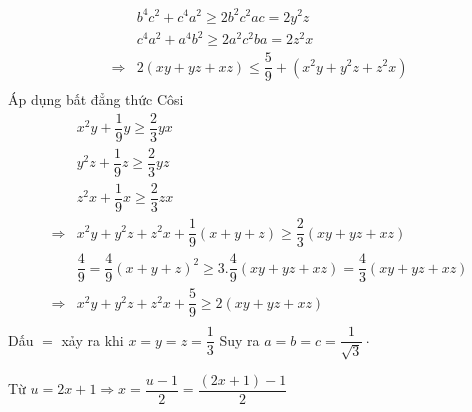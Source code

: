 \begin{ex}
{\begin{align*}
&b^4c^2+c^4a^2\geq 2b^2c^2ac=2y^2z\\&
c^4a^2+a^4b^2\geq 2a^2c^2ba=2z^2x\\
\Rightarrow & 2(xy+yz+xz)\leq \dfrac{5}{9}+(x^2y+y^2z+z^2x)\\&
\end{align*}
		Áp dụng bất đẳng thức Côsi
\begin{align*}
&x^2y+\dfrac{1}{9}y\geq \dfrac{2}{3}yx\\
&y^2z+\dfrac{1}{9}z\geq \dfrac{2}{3}yz\\
&z^2x+\dfrac{1}{9}x\geq \dfrac{2}{3}zx\\
\Rightarrow & x^2y+y^2z+z^2x+\dfrac{1}{9}(x+y+z)\geq \dfrac{2}{3}(xy+yz+xz)\\
&\dfrac{4}{9}=\dfrac{4}{9}(x+y+z)^2\geq 3.\dfrac{4}{9}(xy+yz+xz)=\dfrac{4}{3}(xy+yz+xz)\\
\Rightarrow & x^2y+y^2z+z^2x+\dfrac{5}{9}\geq 2(xy+yz+xz)\\
\end{align*}
		Dấu $=$ xảy ra khi $x= y = z = \dfrac{1}{3}$ Suy ra $a = b = c =\dfrac{1}{\sqrt{3}}\cdot$
	}
\end{ex}


Từ $u=2x+1\Rightarrow x=\dfrac{u-1}{2}=\dfrac{(2x+1)-1}{2}$





